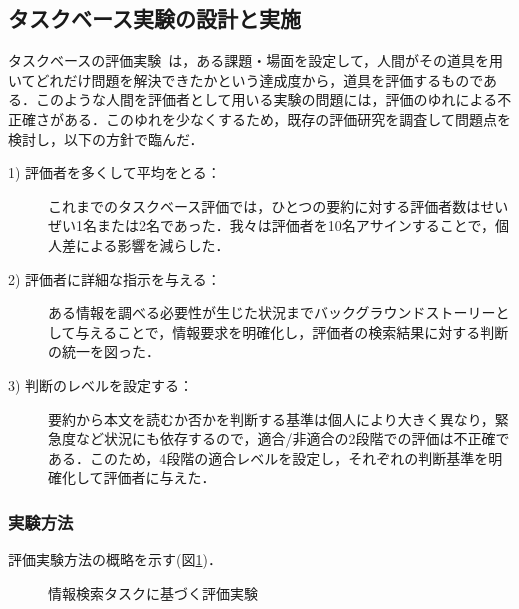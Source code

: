 \subsection{タスクベース実験の設計と実施}
タスクベースの評価実験~\cite{jing98,mani98,hand97}は，ある課題・場面を設定して，人間がその道具を用いてどれだけ問題を解決できたかという達成度から，道具を評価するものである．このような人間を評価者として用いる実験の問題には，評価のゆれによる不正確さがある．このゆれを少なくするため，既存の評価研究を調査して問題点を検討し，以下の方針で臨んだ．

\begin{description}
 \item[1) 評価者を多くして平均をとる：]
 これまでのタスクベース評価では，ひとつの要約に対する評価者数はせいぜい1名または2名であった．我々は評価者を10名アサインすることで，個人差による影響を減らした．

 \item[2) 評価者に詳細な指示を与える：]
 ある情報を調べる必要性が生じた状況までバックグラウンドストーリーとして与えることで，情報要求を明確化し，評価者の検索結果に対する判断の統一を図った．

 \item[3) 判断のレベルを設定する：]
 要約から本文を読むか否かを判断する基準は個人により大きく異なり，緊急度など状況にも依存するので，適合/非適合の2段階での評価は不正確である．このため，4段階の適合レベルを設定し，それぞれの判断基準を明確化して評価者に与えた．
\end{description}

\subsubsection{実験方法}

評価実験方法の概略を示す(図\ref{expoutline})．

\begin{figure}[htbp]
  \begin{center}
    \caption{情報検索タスクに基づく評価実験}
    \label{expoutline}
  \end{center}
\end{figure}

